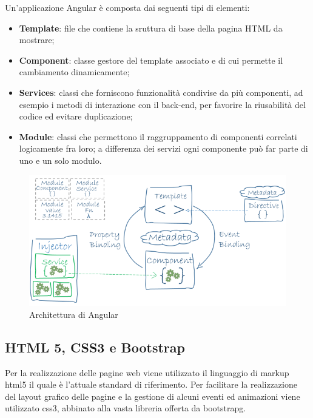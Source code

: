 	Un’applicazione Angular è composta dai seguenti tipi di elementi:
	\begin{itemize}
	\item \textbf{Template}: file che contiene la sruttura di base della pagina HTML da mostrare;
	\item \textbf{Component}: classe gestore del template associato e di cui permette il cambiamento dinamicamente;
	\item \textbf{Services}: classi che forniscono funzionalità condivise da più componenti, ad esempio i metodi di interazione con il back-end, per favorire la riusabilità del codice ed evitare duplicazione;
	\item \textbf{Module}: classi che permettono il raggruppamento di componenti correlati logicamente fra loro; a differenza dei servizi ogni componente può far parte di uno e un solo modulo.
	\end{itemize}

	\begin{figure}[H]
		\centering
		\includegraphics[width=0.8\linewidth]{immagini/angular-arch}
		\caption{Architettura di Angular}
		\label{fig:angular-arch}
	\end{figure}
	
	\subsection{HTML 5, CSS3 e Bootstrap}
	\label{tec:web}
	Per la realizzazione delle pagine web viene utilizzato il linguaggio di markup \gls{html}5
il quale è l’attuale standard di riferimento. Per facilitare la realizzazione del layout
grafico delle pagine e la gestione di alcuni eventi ed animazioni viene utilizzato 
\gls{css}3, abbinato alla vasta libreria offerta da \gls{bootstrapg}\cite{site:bootstrap}.
	
